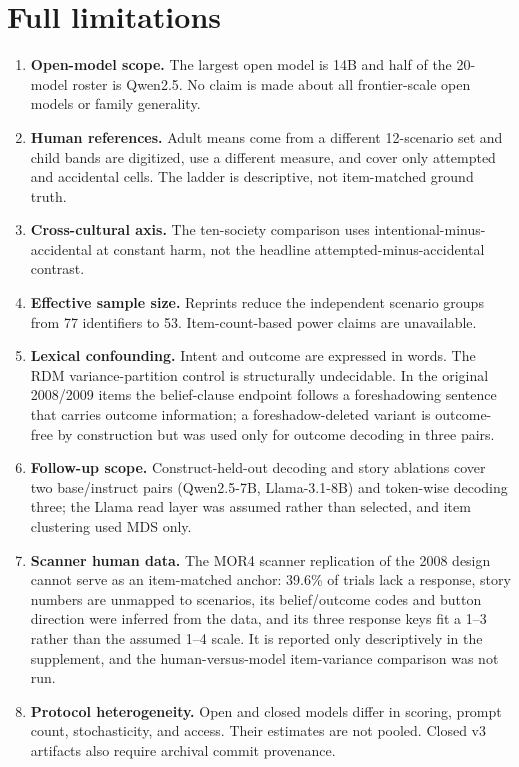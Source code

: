\section{Full limitations}

\begin{enumerate}[leftmargin=*]
    \item \textbf{Open-model scope.} The largest open model is 14B and half of the 20-model roster is Qwen2.5. No claim is made about all frontier-scale open models or family generality.
    \item \textbf{Human references.} Adult means come from a different 12-scenario set and child bands are digitized, use a different measure, and cover only attempted and accidental cells. The ladder is descriptive, not item-matched ground truth.
    \item \textbf{Cross-cultural axis.} The ten-society comparison uses intentional-minus-accidental at constant harm, not the headline attempted-minus-accidental contrast.
    \item \textbf{Effective sample size.} Reprints reduce the independent scenario groups from 77 identifiers to 53. Item-count-based power claims are unavailable.
    \item \textbf{Lexical confounding.} Intent and outcome are expressed in words. The RDM variance-partition control is structurally undecidable. In the original 2008/2009 items the belief-clause endpoint follows a foreshadowing sentence that carries outcome information; a foreshadow-deleted variant is outcome-free by construction but was used only for outcome decoding in three pairs.
    \item \textbf{Follow-up scope.} Construct-held-out decoding and story ablations cover two base/instruct pairs (Qwen2.5-7B, Llama-3.1-8B) and token-wise decoding three; the Llama read layer was assumed rather than selected, and item clustering used MDS only.
    \item \textbf{Scanner human data.} The MOR4 scanner replication of the 2008 design cannot serve as an item-matched anchor: 39.6\% of trials lack a response, story numbers are unmapped to scenarios, its belief/outcome codes and button direction were inferred from the data, and its three response keys fit a 1--3 rather than the assumed 1--4 scale. It is reported only descriptively in the supplement, and the human-versus-model item-variance comparison was not run.
    \item \textbf{Protocol heterogeneity.} Open and closed models differ in scoring, prompt count, stochasticity, and access. Their estimates are not pooled. Closed v3 artifacts also require archival commit provenance.

\end{enumerate}
